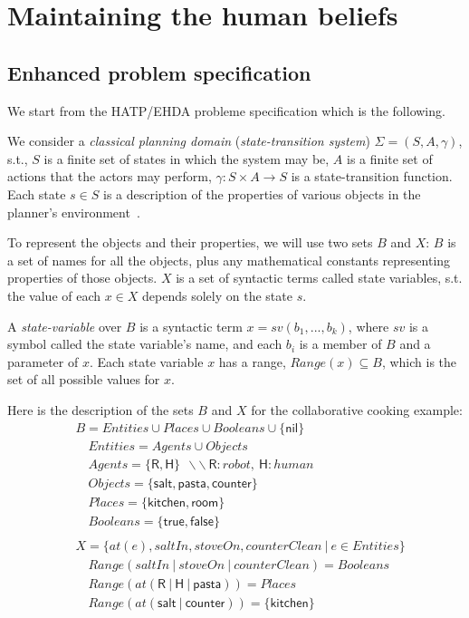\section{Maintaining the human beliefs}

    \subsection{Enhanced problem specification}

We start from the HATP/EHDA probleme specification which is the following.

We consider a \textit{classical planning domain} (\textit{state-transition system}) $\Sigma = (S,A,\gamma)$, s.t., $S$ is a finite set of states in which the system may be, $A$ is a finite set of actions that the actors may perform, $\gamma : S \times A \rightarrow S$ is a state-transition function. Each state $s \in S$ is a description of the properties of various objects in the planner's environment~\cite{naubooks0014222}. 

To represent the objects and their properties, we will use two sets $B$ and $X$: $B$ is a set of names for all the objects, plus any mathematical constants representing properties of those objects. $X$ is a set of syntactic terms called state variables, s.t. the value of each $x \in X$ depends solely on the state $s$.

A \textit{state-variable} over $B$ is a syntactic term $x = sv(b_1, ..., b_k)$, where $sv$ is a symbol called the state variable's name, and each $b_i$ is a member of $B$ and a parameter of $x$. Each state variable $x$ has a range, $\textit{Range}(x) \subseteq B$, which is the set of all possible values for $x$.

Here is the description of the sets $B$ and $X$ for the collaborative cooking example:
{\small
\begin{align*}
&B           = Entities \cup Places \cup Booleans \cup \{\textsf{nil}\} \\
&\quad Entities    = Agents \cup Objects\\
&\quad Agents      = \{ \textsf{R}, \textsf{H} \} ~~ \backslash\backslash~\textsf{R}:robot,~\textsf{H}:human\\
&\quad Objects     = \{ \textsf{salt}, \textsf{pasta}, \textsf{counter} \}\\
&\quad Places      = \{ \textsf{kitchen}, \textsf{room} \}\\
&\quad Booleans    = \{ \textsf{true},\textsf{false} \}\\
&\\
&X = \{ at(e), saltIn, stoveOn, counterClean ~ | ~ e \in Entities \}\\
&\quad \textit{Range}(saltIn ~|~ stoveOn ~|~ counterClean)=Booleans\\
&\quad \textit{Range}(at(\textsf{R} ~|~ \textsf{H} ~|~ \textsf{pasta})) = Places\\
&\quad \textit{Range}(at(\textsf{salt} ~|~ \textsf{counter})) = \{ \textsf{kitchen} \}
\end{align*}
}

